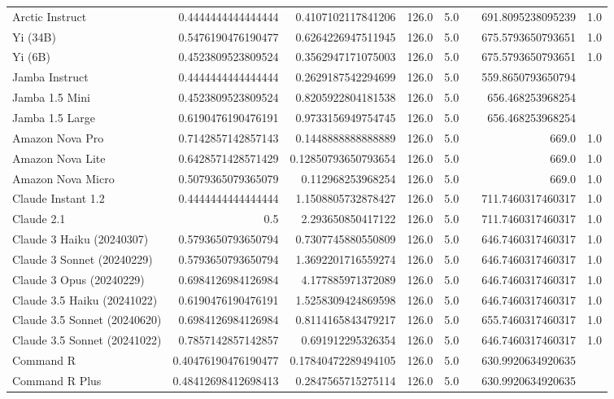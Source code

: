 \begin{table}[htp]
{\begin{tabular}{lrrrrrrr}
Arctic Instruct & 0.4444444444444444 & 0.4107102117841206 & 126.0 & 5.0 &  & 691.8095238095239 & 1.0 \\
Yi (34B) & 0.5476190476190477 & 0.6264226947511945 & 126.0 & 5.0 &  & 675.5793650793651 & 1.0 \\
Yi (6B) & 0.4523809523809524 & 0.3562947171075003 & 126.0 & 5.0 &  & 675.5793650793651 & 1.0 \\
Jamba Instruct & 0.4444444444444444 & 0.2629187542294699 & 126.0 & 5.0 &  & 559.8650793650794 &  \\
Jamba 1.5 Mini & 0.4523809523809524 & 0.8205922804181538 & 126.0 & 5.0 &  & 656.468253968254 &  \\
Jamba 1.5 Large & 0.6190476190476191 & 0.9733156949754745 & 126.0 & 5.0 &  & 656.468253968254 &  \\
Amazon Nova Pro & 0.7142857142857143 & 0.1448888888888889 & 126.0 & 5.0 &  & 669.0 & 1.0 \\
Amazon Nova Lite & 0.6428571428571429 & 0.12850793650793654 & 126.0 & 5.0 &  & 669.0 & 1.0 \\
Amazon Nova Micro & 0.5079365079365079 & 0.112968253968254 & 126.0 & 5.0 &  & 669.0 & 1.0 \\
Claude Instant 1.2 & 0.4444444444444444 & 1.1508805732878427 & 126.0 & 5.0 &  & 711.7460317460317 & 1.0 \\
Claude 2.1 & 0.5 & 2.293650850417122 & 126.0 & 5.0 &  & 711.7460317460317 & 1.0 \\
Claude 3 Haiku (20240307) & 0.5793650793650794 & 0.7307745880550809 & 126.0 & 5.0 &  & 646.7460317460317 & 1.0 \\
Claude 3 Sonnet (20240229) & 0.5793650793650794 & 1.3692201716559274 & 126.0 & 5.0 &  & 646.7460317460317 & 1.0 \\
Claude 3 Opus (20240229) & 0.6984126984126984 & 4.177885971372089 & 126.0 & 5.0 &  & 646.7460317460317 & 1.0 \\
Claude 3.5 Haiku (20241022) & 0.6190476190476191 & 1.5258309424869598 & 126.0 & 5.0 &  & 646.7460317460317 & 1.0 \\
Claude 3.5 Sonnet (20240620) & 0.6984126984126984 & 0.8114165843479217 & 126.0 & 5.0 &  & 655.7460317460317 & 1.0 \\
Claude 3.5 Sonnet (20241022) & 0.7857142857142857 & 0.691912295326354 & 126.0 & 5.0 &  & 646.7460317460317 & 1.0 \\
Command R & 0.40476190476190477 & 0.17840472289494105 & 126.0 & 5.0 &  & 630.9920634920635 &  \\
Command R Plus & 0.48412698412698413 & 0.2847565715275114 & 126.0 & 5.0 &  & 630.9920634920635 &  \\

\end{tabular}}
\end{table}

